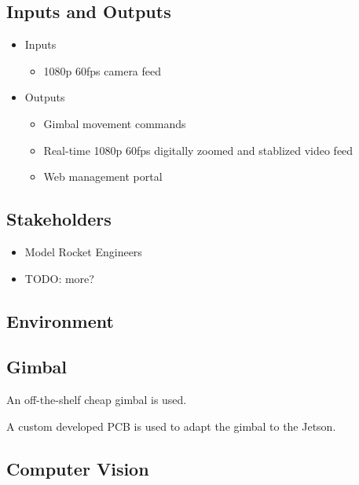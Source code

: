 \documentclass{article}
\begin{document}
\subsection{Inputs and Outputs}


\begin{itemize}
    \item Inputs
    \begin{itemize}
        \item 1080p 60fps camera feed
    \end{itemize}
    \item Outputs
    \begin{itemize}
        \item Gimbal movement commands
        \item Real-time 1080p 60fps digitally zoomed and stablized video feed
        \item Web management portal
    \end{itemize}
\end{itemize}

\subsection{Stakeholders}

\begin{itemize}
    \item Model Rocket Engineers
    \item TODO: more?
\end{itemize}

\subsection{Environment}


\subsection{Gimbal}

An off-the-shelf cheap gimbal is used.

A custom developed PCB is used to adapt the gimbal to the Jetson.

\subsection{Computer Vision}
\end{document}
